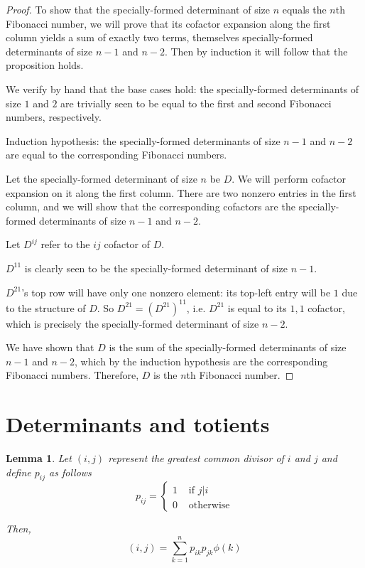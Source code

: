 \documentclass{article}
\newtheorem{lemma}{Lemma}
\begin{document}
\begin{proof}
    To show that the specially-formed determinant of size $n$ equals the $n$th
    Fibonacci number, we will prove that its cofactor expansion along the first
    column yields a sum of exactly two terms, themselves specially-formed
    determinants of size $n-1$ and $n-2$. Then by induction it will follow that
    the proposition holds.

    We verify by hand that the base cases hold: the specially-formed
    determinants of size $1$ and $2$ are trivially seen to be equal to the
    first and second Fibonacci numbers, respectively.

    Induction hypothesis: the specially-formed determinants of size $n-1$ and $n-2$
    are equal to the corresponding Fibonacci numbers.

    Let the specially-formed determinant of size $n$ be $D$. We will perform
    cofactor expansion on it along the first column. There are two nonzero
    entries in the first column, and we will show that the corresponding
    cofactors are the specially-formed determinants of size $n-1$ and $n-2$.

    Let $D^{ij}$ refer to the $ij$ cofactor of $D$.

    $D^11$ is clearly seen to be the specially-formed determinant of size
    $n-1$.

    $D^{21}$'s top row will have only one nonzero element: its top-left entry
    will be $1$ due to the structure of $D$. So $D^{21} = (D^{21})^{11}$, i.e.
    $D^{21}$ is equal to its $1,1$ cofactor, which is precisely the
    specially-formed determinant of size $n-2$.

    We have shown that $D$ is the sum of the specially-formed determinants of
    size $n-1$ and $n-2$, which by the induction hypothesis are the
    corresponding Fibonacci numbers.
    Therefore, $D$ is the $n$th Fibonacci number.
\end{proof}

\section{Determinants and totients}

\begin{lemma}
    Let $(i,j)$ represent the greatest common divisor of $i$ and $j$ and
    define $p_{ij}$ as follows
    $$
    p_{ij} =
    \begin{cases}
        1 & \text{ if } j|i \\
        0 & \text{ otherwise}
    \end{cases}
    $$

    Then,
    $$(i, j) = \sum_{k=1}^n {p_{ik} p_{jk} \phi(k)}$$
\end{lemma}
\end{document}
